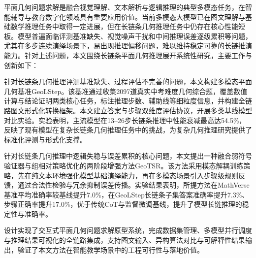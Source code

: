 
\begin{chineseabstract}

    平面几何问题求解是融合视觉理解、文本解析与逻辑推理的典型多模态任务，在智能辅导与教育数字化领域具有重要应用价值。当前多模态大模型已在图文理解与基础数学推理任务中取得一定进展，但在长链条几何推理任务中仍存在核心性能短板。模型普遍面临评测基准缺失、视觉噪声干扰和中间推理误差逐级累积等问题，尤其在多步连续演绎场景下，易出现推理偏移问题，难以维持稳定可靠的长链推演能力。针对上述问题，本文围绕长链条平面几何推理展开系统性研究，主要工作与创新如下：

    针对长链条几何推理评测基准缺失、过程评估不完善的问题，本文构建多模态平面几何基准GeoLStep。该基准通过收集2097道真实中考难度几何综合题，覆盖数值计算与结论证明两类核心任务，标注推理步数、辅助线等细粒度信息，并构建全链路图文形式化转换框架。本文建立答案与步骤双维度评估协议，开展多类基线模型对比实验。实验表明，主流模型在13--26步长链条推理中性能衰减最高达54.5\%，反映了现有模型在复杂长链条几何推理任务中的挑战，为复杂几何推理研究提供了标准化评测与形式化支撑。

    针对长链条几何推理中逻辑失稳与误差累积的核心问题，本文提出一种融合弱符号验证器与组相对策略优化的两阶段增强方法GeoTSR。该方法采用模态解耦训练策略，先在纯文本环境强化模型基础演绎能力，再在多模态场景引入步骤级规则反馈，通过合法性检验与冗余抑制误差传播。实验结果表明，所提方法在MathVerse基准平均准确率较基线提升7.0\%，在GeoLStep长链条子集答案准确率提升7.3\%、步骤正确率提升17.0\%，优于传统CoT与监督微调基线，提升了模型长链推理的稳定性与准确率。

    设计实现了交互式平面几何问题求解原型系统，完成数据集管理、多模型并行调度与推理结果可视化的全链路集成，支持图文输入、异构算法对比与可解释性结果输出，验证了本文方法在智能教学场景中的工程可行性与落地价值。



\end{chineseabstract}


